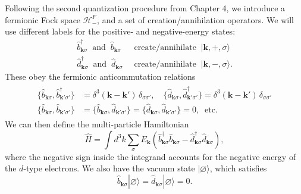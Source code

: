\documentclass[prx,12pt]{revtex4-2}
\begin{document}
Following the second quantization procedure from Chapter 4, we
introduce a fermionic Fock space $\mathscr{H}^F_-$, and a set of
creation/annihilation operators.  We will use different labels for the
positive- and negative-energy states:
\begin{align*}
  \hat{b}_{\mathbf{k}\sigma}^\dagger \;\; \mathrm{and} \;\; \hat{b}_{\mathbf{k}\sigma}
  &\;\;\mathrm{create/annihilate} \;\; |\mathbf{k}, +, \sigma\rangle\\
  \hat{d}_{\mathbf{k}\sigma}^\dagger \;\; \mathrm{and} \;\; \hat{d}_{\mathbf{k}\sigma}
  &\;\;\mathrm{create/annihilate} \;\; |\mathbf{k}, -, \sigma\rangle.
\end{align*}
These obey the fermionic anticommutation relations
\begin{align}
  \begin{aligned}
    \{\hat{b}_{\mathbf{k}\sigma}, \hat{b}_{\mathbf{k}'\sigma'}^\dagger \}
    &= \delta^3(\mathbf{k}-\mathbf{k}') \, \delta_{\sigma\sigma'}, \quad
    \{\hat{d}_{\mathbf{k}\sigma}, \hat{d}_{\mathbf{k}'\sigma'}^\dagger \}
    = \delta^3(\mathbf{k}-\mathbf{k}') \, \delta_{\sigma\sigma'} \\
    \{\hat{b}_{\mathbf{k}\sigma}, \hat{b}_{\mathbf{k}'\sigma'} \} &= 
    \{\hat{b}_{\mathbf{k}\sigma}, \hat{d}_{\mathbf{k}'\sigma'} \} = 
    \{\hat{d}_{\mathbf{k}\sigma}, \hat{d}_{\mathbf{k}'\sigma'} \} = 0, \;\;\textrm{etc.}
  \end{aligned}
  \label{Diracanticommutation0}
\end{align}
We can then define the multi-particle Hamiltonian
\begin{equation}
  \hat{H} = \int d^3k \sum_\sigma E_{\mathbf{k}} \left(
  \hat{b}^\dagger_{\mathbf{k}\sigma} \hat{b}_{\mathbf{k}\sigma}
  - \hat{d}^\dagger_{\mathbf{k}\sigma} \hat{d}_{\mathbf{k}\sigma}
  \right),
  \label{HDiracQFT0}
\end{equation}
where the negative sign inside the integrand accounts for the negative
energy of the $d$-type electrons.  We also have the vacuum state
$|\varnothing\rangle$, which satisfies
\begin{equation}
  \hat{b}_{\mathbf{k}\sigma} |\varnothing\rangle =
  \hat{d}_{\mathbf{k}\sigma} |\varnothing\rangle = 0.
  \label{oldvacuum}
\end{equation}
\end{document}
